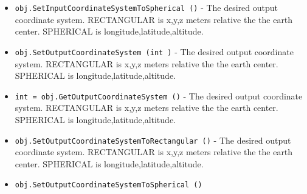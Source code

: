 \begin{itemize}
\item  \verb|obj.SetInputCoordinateSystemToSpherical ()| -  The desired output coordinate system.
 RECTANGULAR is x,y,z meters relative the the earth center.
 SPHERICAL is longitude,latitude,altitude.

\item  \verb|obj.SetOutputCoordinateSystem (int )| -  The desired output coordinate system.
 RECTANGULAR is x,y,z meters relative the the earth center.
 SPHERICAL is longitude,latitude,altitude.

\item  \verb|int = obj.GetOutputCoordinateSystem ()| -  The desired output coordinate system.
 RECTANGULAR is x,y,z meters relative the the earth center.
 SPHERICAL is longitude,latitude,altitude.

\item  \verb|obj.SetOutputCoordinateSystemToRectangular ()| -  The desired output coordinate system.
 RECTANGULAR is x,y,z meters relative the the earth center.
 SPHERICAL is longitude,latitude,altitude.

\item  \verb|obj.SetOutputCoordinateSystemToSpherical ()|

\end{itemize}
